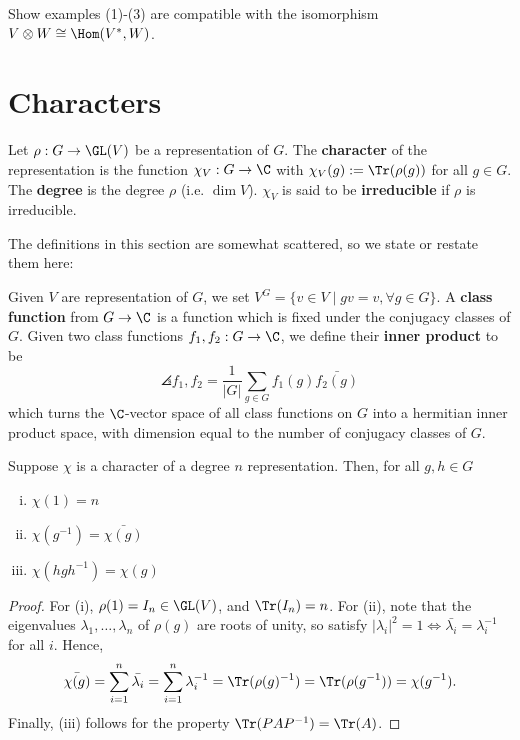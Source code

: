 \begin{notebox*}[Exercise]
    Show examples (1)-(3) are compatible with the isomorphism $V \otimes W \cong \Hom(V^*,W)$.
\end{notebox*}

\section{Characters}

\begin{defn}
    Let $\rho :G \to \GL(V)$ be a representation of $G$. The \textbf{character} of the representation is the function $\chi _V:G \to \C$ with $\chi _V(g):= \Tr(\rho (g))$ for all $g \in G$. The \textbf{degree} is the degree $\rho$ (i.e. $\dim V$). $\chi _V$ is said to be \textbf{irreducible} if $\rho$ is irreducible.
\end{defn}

The definitions in this section are somewhat scattered, so we state or restate them here:

\begin{defn}
    Given $V$ are representation of $G$, we set $V^G=\{ v \in V \mid gv=v,\forall g \in G\}$. A \textbf{class function} from $G \to \C$ is a function which is fixed under the conjugacy classes of $G$. Given two class functions $f_1,f_2:G \to \C$, we define their \textbf{inner product} to be
    $$\angles{f_1,f_2}=\frac{1}{|G|}\sum_{g \in G}f_1(g)\bar{f_2(g)}$$
    which turns the $\C$-vector space of all class functions on $G$ into a hermitian inner product space, with dimension equal to the number of conjugacy classes of $G$.
\end{defn}

\begin{prop}[][label=prop:prop1]
    Suppose $\chi$ is a character of a degree $n$ representation. Then, for all $g,h \in G$
    \begin{enumerate}[(i)]
        \item $\chi(1)=n$
        \item $\chi(g^{-1})=\bar{\chi (g)}$
        \item $\chi (hgh^{-1})=\chi (g)$
    \end{enumerate}
\end{prop}

\begin{proof}
For (i), $\rho(1) = I_n \in \GL(V)$, and $\Tr(I_n)=n$. For (ii), note that the eigenvalues $\lambda_1,\dots,\lambda_n$ of $\rho(g)$ are roots of unity, so satisfy $|\lambda_ i|^2=1 \iff \bar{\lambda _i}=\lambda_i^{-1}$ for all $i$. Hence,
$$\bar{\chi (g)}=\sum_{i=1}^n\bar{\lambda_i}=\sum_{i=1}^n \lambda_i^{-1}=\Tr(\rho(g)^{-1})=\Tr (\rho(g^{-1}))=\chi (g^{-1}).$$
Finally, (iii) follows for the property $\Tr (PAP^{-1})=\Tr(A)$.
\end{proof}

